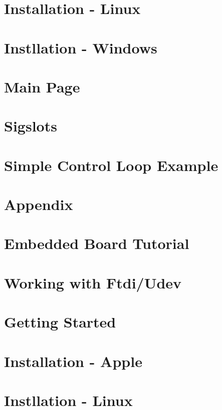 \documentclass[a4paper]{book}
\begin{document}
\chapter{\-Installation -\/ \-Linux}
\label{enInstallationLinuxGuide}

\chapter{\-Instllation -\/ \-Windows}
\label{enInstallationWindowsGuide}

\chapter{\-Main \-Page}
\label{enMainPage}

\chapter{\-Sigslots}
\label{enSigslotsGuide}

\chapter{\-Simple \-Control \-Loop \-Example}
\label{enSimpleExample}

\chapter{\-Appendix}
\label{koAppendixGuide}

\chapter{\-Embedded \-Board \-Tutorial}
\label{koEmbeddedBoardTutorial}

\chapter{\-Working with \-Ftdi/\-Udev}
\label{koFtdiGuide}

\chapter{\-Getting \-Started}
\label{koGettingStartedGuide}

\chapter{\-Installation -\/ \-Apple}
\label{enInstallationAppleGuide}

\chapter{\-Instllation -\/ \-Linux}
\label{koInstallationLinuxGuide}

\end{document}
